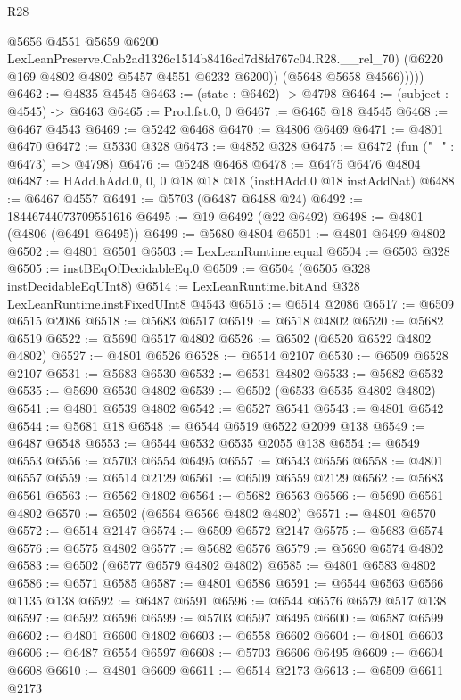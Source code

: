 \begin{lexlean}{R28}
\begin{coremodule}
                @5656
                @4551
                @5659
                @6200
                LexLeanPreserve.Cab2ad1326c1514b8416cd7d8fd767c04.R28.__rel_70)
              (@6220 @169 @4802 @4802 @5457 @4551 @6232 @6200))
            (@5648 @5658 @4566)))))
@6462 := @4835 @4545
@6463 := (state : @6462) -> @4798
@6464 := (subject : @4545) -> @6463
@6465 := Prod.fst.{0, 0}
@6467 := @6465 @18 @4545
@6468 := @6467 @4543
@6469 := @5242 @6468
@6470 := @4806 @6469
@6471 := @4801 @6470
@6472 := @5330 @328
@6473 := @4852 @328
@6475 := @6472 (fun ("_" : @6473) => @4798)
@6476 := @5248 @6468
@6478 := @6475 @6476 @4804
@6487 := HAdd.hAdd.{0, 0, 0} @18 @18 @18 (instHAdd.{0} @18 instAddNat)
@6488 := @6467 @4557
@6491 := @5703 (@6487 @6488 @24)
@6492 := 18446744073709551616
@6495 := @19 @6492 (@22 @6492)
@6498 := @4801 (@4806 (@6491 @6495))
@6499 := @5680 @4804
@6501 := @4801 @6499 @4802
@6502 := @4801 @6501
@6503 := LexLeanRuntime.equal
@6504 := @6503 @328
@6505 := instBEqOfDecidableEq.{0}
@6509 := @6504 (@6505 @328 instDecidableEqUInt8)
@6514 := LexLeanRuntime.bitAnd @328 LexLeanRuntime.instFixedUInt8 @4543
@6515 := @6514 @2086
@6517 := @6509 @6515 @2086
@6518 := @5683 @6517
@6519 := @6518 @4802
@6520 := @5682 @6519
@6522 := @5690 @6517 @4802
@6526 := @6502 (@6520 @6522 @4802 @4802)
@6527 := @4801 @6526
@6528 := @6514 @2107
@6530 := @6509 @6528 @2107
@6531 := @5683 @6530
@6532 := @6531 @4802
@6533 := @5682 @6532
@6535 := @5690 @6530 @4802
@6539 := @6502 (@6533 @6535 @4802 @4802)
@6541 := @4801 @6539 @4802
@6542 := @6527 @6541
@6543 := @4801 @6542
@6544 := @5681 @18
@6548 := @6544 @6519 @6522 @2099 @138
@6549 := @6487 @6548
@6553 := @6544 @6532 @6535 @2055 @138
@6554 := @6549 @6553
@6556 := @5703 @6554 @6495
@6557 := @6543 @6556
@6558 := @4801 @6557
@6559 := @6514 @2129
@6561 := @6509 @6559 @2129
@6562 := @5683 @6561
@6563 := @6562 @4802
@6564 := @5682 @6563
@6566 := @5690 @6561 @4802
@6570 := @6502 (@6564 @6566 @4802 @4802)
@6571 := @4801 @6570
@6572 := @6514 @2147
@6574 := @6509 @6572 @2147
@6575 := @5683 @6574
@6576 := @6575 @4802
@6577 := @5682 @6576
@6579 := @5690 @6574 @4802
@6583 := @6502 (@6577 @6579 @4802 @4802)
@6585 := @4801 @6583 @4802
@6586 := @6571 @6585
@6587 := @4801 @6586
@6591 := @6544 @6563 @6566 @1135 @138
@6592 := @6487 @6591
@6596 := @6544 @6576 @6579 @517 @138
@6597 := @6592 @6596
@6599 := @5703 @6597 @6495
@6600 := @6587 @6599
@6602 := @4801 @6600 @4802
@6603 := @6558 @6602
@6604 := @4801 @6603
@6606 := @6487 @6554 @6597
@6608 := @5703 @6606 @6495
@6609 := @6604 @6608
@6610 := @4801 @6609
@6611 := @6514 @2173
@6613 := @6509 @6611 @2173

\end{coremodule}
\end{lexlean}
